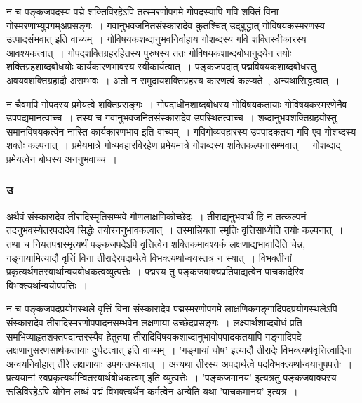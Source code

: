 				न च पङ्कजपदस्य पद्मे शक्तिविरहेऽपि तत्स्मरणोपगमे गोपदस्यापि गवि शक्तिं विना गोस्मरणाभ्युपगम्अप्रसङ्गः~। गवानुभवजनितसंस्कारादेव कुतश्चित् उद्बुद्धात् गोविषयकस्मरणस्य उत्पादसंभवात् इति वाच्यम्~। गोविषयकशब्दानुभवनिर्वाहाय गोशब्दस्य गवि शक्तिस्वीकारस्य आवश्यकत्वात्~।  गोपदशक्तिग्रहरहितस्य पुरुषस्य ततः गोविषयकशाब्दबोधानुदयेन तयोः शक्तिग्रहशाब्दबोधयोः कार्यकारणभावस्य स्वीकार्यत्वात्~। पङ्कजपदात् पद्मविषयकशाब्दबोधस्तु  अवयवशक्तिग्रहादौ असम्भवः~।  अतो न समुदायशक्तिग्रहस्य कारणत्वं कल्प्यते~, अन्यथासिद्धत्वात्~। 
	
				न चैवमपि गोपदस्य प्रमेयत्वे शक्तिप्रसङ्गः~।  गोपदाधीनशाब्दबोधस्य गोविषयकतायाः गोविषयकस्मरणेनैव उपपद्यमानत्वाच्च~।  तस्य च गवानुभवजनितसंस्कारादेव उपस्थितत्वाच्च~।  शब्दानुभवशक्तिग्रहयोस्तु समानविषयकत्वेन नास्ति कार्यकारणभाव इति वाच्यम्~। गविगोव्यवहारस्य उपपादकतया गवि एव गोशब्दस्य शक्तेः कल्पनात्~।  प्रमेयमात्रे गोव्यवहारविरहेण प्रमेयमात्रे गोशब्दस्य  शक्तिकल्पनासम्भवात्~।  गोशब्दाद् प्रमेयत्वेन बोधस्य अननुभवाच्च~। 
	
			\subsubsection{उ}
	
				\begin{small}
				
					अथैवं संस्कारादेव तीरादिस्मृतिसम्भवे गौणलाक्षणिकोच्छेदः~। तीराद्यनुभवार्थं हि न तत्कल्पनं तदनुभवस्येतरपदादेव सिद्धेः तयोरननुभावकत्वात्~। तस्मान्नियता स्मृतिः वृत्तिसाध्येति तयोः कल्पनात्~। तथा च नियतपद्मस्मृत्यर्थं पङ्कजपदेऽपि वृत्तित्वेन शक्तिकमावश्यकं लक्षणाद्यभावादिति चेन्न, गङ्गायामित्यादौ वृत्तिं विना तीरादेरपदार्थत्वे विभक्त्यर्थान्वयस्तत्र न स्यात्~। विभक्तीनां प्रकृत्यर्थगतस्वार्थान्वयबोधकत्वव्युत्पत्तेः~। पद्मस्य तु पङ्कजवाक्यप्रतिपाद्यत्वेन पाचकादेरिव विभक्त्यर्थान्वयोपपत्तिः~।
				\end{small}
			
				न च पङ्कजपदप्रयोगस्थले  वृत्तिं विना संस्कारादेव पद्मस्मरणोपगमे लाक्षणिकगङ्गादिपदप्रयोगस्थलेऽपि संस्कारादेव तीरादिस्मरणोपपादनसम्भवेन लक्षणाया उच्छेदप्रसङ्गः~।  लक्ष्यार्थशाब्दबोधं प्रति समभिव्याहृतशक्तपदान्तरस्यैव हेतुतया तीरादिविषयकशाब्दानुभावोपपादकतयापि गङ्गादिपदे लक्षणानुसरणसार्थकतायाः दुर्घटत्वात् इति वाच्यम्~। ’गङ्गायां घोष’ इत्यादौ तीरादेः विभक्त्यर्थवृत्तित्वादिना अन्वयनिर्वाहात् तीरे लक्षणायाः उपगन्तव्यत्वात्~।  अन्यथा तीरस्य अपदार्थत्वे पदविभक्त्यर्थान्वयानुपपत्तेः~।  प्रत्ययानां स्वप्रकृत्यर्थान्वितस्वार्थबोधकत्वम् इति व्युत्पत्तेः~।  ’पङ्कजमानय’ इत्यत्रतु पङ्कजवाक्यस्य रूडिविरहेऽपि योगेन लब्धं पद्मं विभक्त्यर्थेन कर्मत्वेन अन्वेति यथा ’पाचकमानय’ इत्यत्र~।
	
